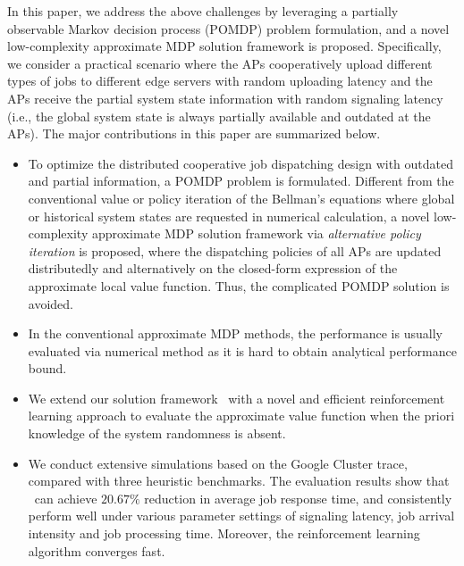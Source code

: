 In this paper, we address the above challenges by leveraging a partially observable Markov decision process (POMDP) problem formulation, and a novel low-complexity approximate MDP solution framework is proposed.
Specifically, we consider a practical scenario where the APs cooperatively upload different types of jobs to different edge servers with random uploading latency and the APs receive the partial system state information with random signaling latency (i.e., the global system state is always partially available and outdated at the APs).
The major contributions in this paper are summarized below.
\begin{itemize}
    \item To optimize the distributed cooperative job dispatching design with outdated and partial information, a POMDP problem is formulated.
    Different from the conventional value or policy iteration of the Bellman's equations where global or historical system states are requested in numerical calculation, a novel low-complexity approximate MDP solution framework via \emph{alternative policy iteration} is proposed, where the dispatching policies of all APs are updated distributedly and alternatively on the {closed-form expression} of the approximate local value function.
    Thus, the complicated POMDP solution is avoided.
    \item {} In the conventional approximate MDP methods, the performance is usually evaluated via numerical method as it is hard to obtain analytical performance bound.
    \item We extend our solution framework \algname~with a novel and efficient reinforcement learning approach to evaluate the approximate value function when the priori knowledge of the system randomness is absent.
    \item We conduct extensive simulations based on the Google Cluster trace, compared with three heuristic benchmarks. The evaluation results show that \algname~can achieve $20.67\%$ reduction in average job response time, and consistently perform well under various parameter settings of signaling latency, job arrival intensity and job processing time. {Moreover, the reinforcement learning algorithm converges fast.}
\end{itemize}

